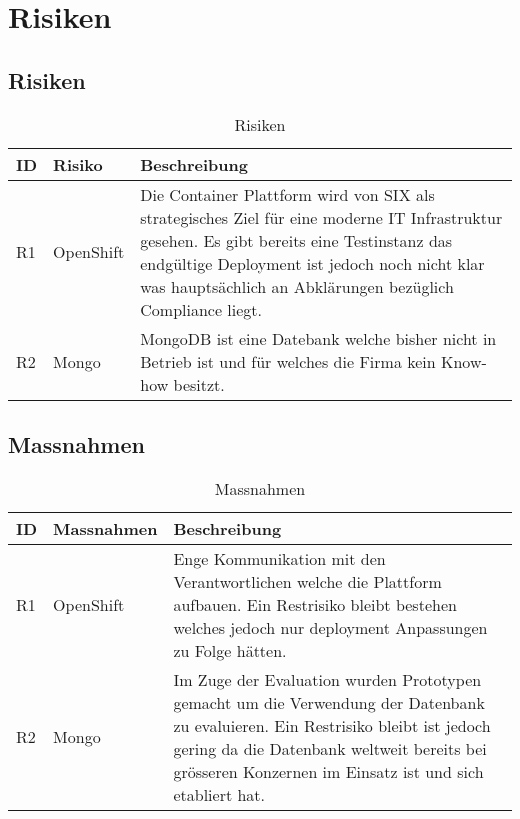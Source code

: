 \chapter{Risiken}

\section{Risiken}

\begin{table}[h!]
	\centering
	\caption{Risiken}
	\begin{tabular}{ | p{1cm} | p{3cm} | p{10cm} |}
		\toprule
		{\textbf{ID}} & {\textbf{Risiko}} & {\textbf{Beschreibung} } \\
		\midrule
		R1 & OpenShift & Die Container Plattform wird von SIX als strategisches Ziel für eine moderne IT Infrastruktur gesehen. Es gibt bereits eine Testinstanz das endgültige Deployment ist jedoch noch nicht klar was hauptsächlich an Abklärungen bezüglich Compliance liegt.  \\ \hline
		R2 & Mongo & MongoDB ist eine Datebank welche bisher nicht in Betrieb ist und für welches die Firma kein Know-how besitzt.\\
		\bottomrule
	\end{tabular}
\end{table}

\section{Massnahmen}
\begin{table}[h!]
	\centering
	\caption{Massnahmen}
	\begin{tabular}{ | p{1cm} | p{3cm} | p{10cm} | }
		\toprule
		{\textbf{ID}} & {\textbf{Massnahmen}} & {\textbf{Beschreibung}} \\
		\midrule
		R1 & OpenShift & Enge Kommunikation mit den Verantwortlichen welche die Plattform aufbauen. Ein Restrisiko bleibt bestehen welches jedoch nur deployment Anpassungen zu Folge hätten. \\ \hline
		R2 & Mongo & Im Zuge der Evaluation wurden Prototypen gemacht um die Verwendung der Datenbank zu evaluieren. Ein Restrisiko bleibt ist jedoch gering da die Datenbank weltweit bereits bei grösseren Konzernen im Einsatz ist und sich etabliert hat. \\
		\bottomrule
	\end{tabular}
\end{table}